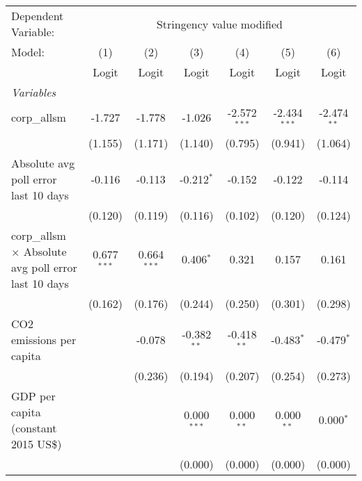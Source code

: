 
\begingroup
\centering
\begin{tabular}{lcccccc}
   \toprule
   Dependent Variable: & \multicolumn{6}{c}{Stringency value modified}\\
   Model:                                                      & (1)           & (2)           & (3)           & (4)            & (5)            & (6)\\  
                                                               &  Logit        & Logit         & Logit         & Logit          & Logit          & Logit\\  
   \midrule
   \emph{Variables}\\
   corp\_allsm                                                 & -1.727        & -1.778        & -1.026        & -2.572$^{***}$ & -2.434$^{***}$ & -2.474$^{**}$\\   
                                                               & (1.155)       & (1.171)       & (1.140)       & (0.795)        & (0.941)        & (1.064)\\   
   Absolute avg poll error last 10 days                        & -0.116        & -0.113        & -0.212$^{*}$  & -0.152         & -0.122         & -0.114\\   
                                                               & (0.120)       & (0.119)       & (0.116)       & (0.102)        & (0.120)        & (0.124)\\   
   corp\_allsm $\times$ Absolute avg poll error last 10 days   & 0.677$^{***}$ & 0.664$^{***}$ & 0.406$^{*}$   & 0.321          & 0.157          & 0.161\\   
                                                               & (0.162)       & (0.176)       & (0.244)       & (0.250)        & (0.301)        & (0.298)\\   
   CO2 emissions per capita                                    &               & -0.078        & -0.382$^{**}$ & -0.418$^{**}$  & -0.483$^{*}$   & -0.479$^{*}$\\   
                                                               &               & (0.236)       & (0.194)       & (0.207)        & (0.254)        & (0.273)\\   
   GDP per capita (constant 2015 US\$)                         &               &               & 0.000$^{***}$ & 0.000$^{**}$   & 0.000$^{**}$   & 0.000$^{*}$\\   
                                                               &               &               & (0.000)       & (0.000)        & (0.000)        & (0.000)\\   

\end{tabular}
